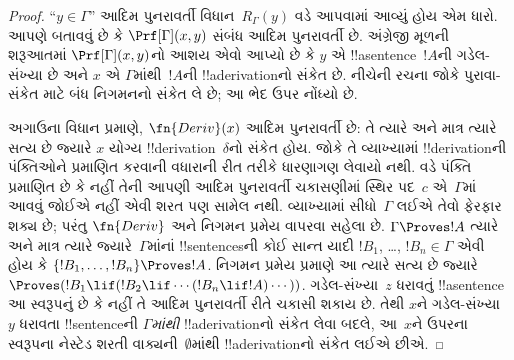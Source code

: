 \documentclass[../../../include/open-logic-section]{subfiles}
\begin{document}
\begin{proof}
``$y \in \Gamma$'' આદિમ પુનરાવર્તી
વિધાન~$R_\Gamma(y)$ વડે આપવામાં
આવ્યું હોય એમ ધારો. આપણે બતાવવું છે
કે $\Prf[\Gamma](x, y)$ સંબંધ આદિમ
પુનરાવર્તી છે. અંગ્રેજી મૂળની
શરૂઆતમાં $\Prf[\Gamma](x, y)$નો
આશય એવો આપ્યો છે કે
$y$ એ !!a{sentence}~$!A$ની
ગડેલ-સંખ્યા છે અને $x$ એ
$\Gamma$માંથી~$!A$ની
!!a{derivation}નો સંકેત છે. નીચેની
રચના જોકે પુરાવા-સંકેત માટે બંધ નિગમનનો
સંકેત લે છે; આ ભેદ ઉપર નોંધ્યો છે.

અગાઉના વિધાન પ્રમાણે,
$\fn{Deriv}(x)$ આદિમ પુનરાવર્તી છે:
તે ત્યારે અને માત્ર ત્યારે સત્ય છે
જ્યારે $x$ યોગ્ય
!!{derivation}~$\delta$નો સંકેત હોય.
જોકે તે વ્યાખ્યામાં !!{derivation}ની પંક્તિઓને
પ્રમાણિત કરવાની વધારાની રીત તરીકે
ધારણાગણ લેવાયો નથી. \QR{} વડે
પંક્તિ પ્રમાણિત છે કે નહીં તેની
આપણી આદિમ પુનરાવર્તી ચકાસણીમાં
સ્થિર પદ~$c$ એ~$\Gamma$માં આવવું
જોઈએ નહીં એવી શરત પણ સામેલ નથી.
વ્યાખ્યામાં સીધો~$\Gamma$ લઈએ તેવો
ફેરફાર શક્ય છે; પરંતુ
$\fn{Deriv}$ અને નિગમન પ્રમેય
વાપરવા સહેલા છે.
$\Gamma \Proves !A$ ત્યારે અને માત્ર
ત્યારે જ્યારે~$\Gamma$માંનાં
!!{sentence}sની કોઈ સાન્ત યાદી
$!B_1$, \dots, $!B_n \in
\Gamma$ એવી હોય કે
$\{!B_1, \dots, !B_n\} \Proves !A$.
નિગમન પ્રમેય પ્રમાણે આ ત્યારે
સત્ય છે જ્યારે
$\Proves (!B_1 \lif (!B_2 \lif
\cdots (!B_n \lif !A)\cdots))$.
ગડેલ-સંખ્યા~$z$ ધરાવતું
!!a{sentence} આ સ્વરૂપનું છે કે
નહીં તે આદિમ પુનરાવર્તી રીતે
ચકાસી શકાય છે. તેથી $x$ને
ગડેલ-સંખ્યા~$y$ ધરાવતા
!!{sentence}ની \emph{$\Gamma$માંથી}
!!a{derivation}નો સંકેત લેવા બદલે,
આ~$x$ને ઉપરના સ્વરૂપના નેસ્ટેડ
શરતી વાક્યની~$\emptyset$માંથી
!!a{derivation}નો સંકેત લઈએ છીએ.


\end{proof}
\end{document}
